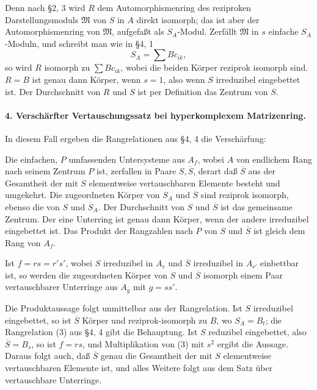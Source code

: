 \documentclass[11pt]{article}
\providecommand{\frM}{\mathfrak M}
\begin{document}
Denn nach §2, 3 wird \(R\) dem Automorphismenring des reziproken Darstellungsmoduls \(\frM\) von \(S\) in \(A\) direkt isomorph; das ist aber der Automorphismenring von \(\frM\), aufgefaßt als \(S_A\)-Modul. Zerfällt \(\frM\) in \(s\) einfache \(S_A\)-Moduln, und schreibt man wie in §4, 1
\[
        S_A=\sum Bc_{ik},
\]
so wird \(R\) isomorph zu \(\sum Bc_{ik}\), wobei die beiden Körper reziprok isomorph sind. \(R=B\) ist genau dann Körper, wenn \(s=1\), also wenn \(S\) irreduzibel eingebettet ist. Der Durchschnitt von \(R\) und \(S\) ist per Definition das Zentrum von \(S\).

\paragraph{4. Verschärfter Vertauschungssatz bei hyperkomplexem Matrizenring.}
In diesem Fall ergeben die Rangrelationen aus §4, 4 die Verschärfung:

Die einfachen, \(P\) umfassenden Untersysteme aus \(A_f\), wobei \(A\) von endlichem Rang nach seinem Zentrum \(P\) ist, zerfallen in Paare \(S,\overline S\), derart daß \(\overline S\) aus der Gesamtheit der mit \(S\) elementweise vertauschbaren Elemente besteht und umgekehrt. Die zugeordneten Körper von \(S_A\) und \(\overline S\) sind reziprok isomorph, ebenso die von \(S\) und \(\overline S_A\). Der Durchschnitt von \(S\) und \(\overline S\) ist das gemeinsame Zentrum. Der eine Unterring ist genau dann Körper, wenn der andere irreduzibel eingebettet ist. Das Produkt der Rangzahlen nach \(P\) von \(S\) und \(\overline S\) ist gleich dem Rang von \(A_f\).

Ist \(f=rs=r's'\), wobei \(S\) irreduzibel in \(A_r\) und \(\overline S\) irreduzibel in \(A_{r'}\) einbettbar ist, so werden die zugeordneten Körper von \(S\) und \(\overline S\) isomorph einem Paar vertauschbarer Unterringe aus \(A_g\) mit \(g=ss'\).

Die Produktaussage folgt unmittelbar aus der Rangrelation. Ist \(S\) irreduzibel eingebettet, so ist \(\overline S\) Körper und reziprok-isomorph zu \(B\), wo \(S_A=B_t\); die Rangrelation (3) aus §4, 4 gibt die Behauptung. Ist \(S\) reduzibel eingebettet, also \(\overline S=B_s\), so ist \(f=rs\), und Multiplikation von (3) mit \(s^2\) ergibt die Aussage. Daraus folgt auch, daß \(\overline S\) genau die Gesamtheit der mit \(S\) elementweise vertauschbaren Elemente ist, und alles Weitere folgt aus dem Satz über vertauschbare Unterringe.
\end{document}
